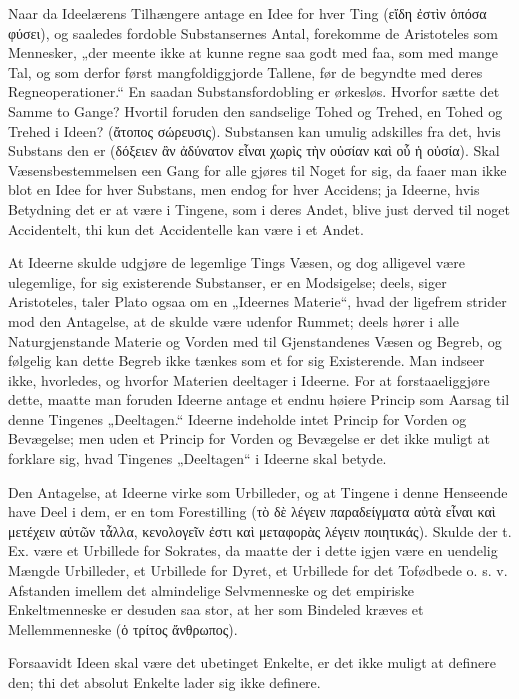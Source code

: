 \documentclass[12pt]{book}
\newcommand{\opage}[1]{\marginnote{\footnotesize\textit{[#1]}}}
\begin{document}
Naar da Ideelærens Tilhængere antage en Idee for hver Ting (εἴδη ἐστὶν ὁπόσα φύσει), og saaledes
fordoble Substansernes Antal, forekomme de Aristoteles som Mennesker, „der meente ikke at kunne
regne saa godt med faa, som med mange Tal, og som derfor først mangfoldiggjorde Tallene, før de
begyndte med deres Regneoperationer.“ En saadan Substansfordobling er ørkesløs. Hvorfor sætte det
Samme to Gange? Hvortil foruden den sandselige Tohed og Trehed, en Tohed og Trehed i Ideen?
(ἄτοπος σώρευσις). Substansen kan umulig adskilles fra det, hvis Substans den er (δόξειεν ἂν
ἀδύνατον εἶναι χωρὶς τὴν οὐσίαν καὶ οὗ ἡ οὐσία). Skal Væsensbestemmelsen een Gang for alle gjøres
til Noget for sig, da faaer man ikke blot en Idee for hver Substans, men endog for hver Accidens;
ja Ideerne, hvis Betydning det er at være i Tingene, som i deres Andet, blive just derved til
noget Accidentelt, thi kun det Accidentelle kan være i et Andet.

At Ideerne skulde udgjøre de legemlige Tings Væsen, og dog alligevel være ulegemlige, for sig
existerende Substanser, er en Modsigelse; deels, siger Aristoteles, taler Plato ogsaa om en
„Ideernes Materie“, hvad der ligefrem strider mod den Antagelse, at de skulde være udenfor
Rummet; deels hører i alle Naturgjenstande Materie og Vorden med til Gjenstandenes Væsen og
Begreb, og følgelig kan dette Begreb ikke tænkes som et for sig Existerende. Man indseer ikke,
hvorledes, og hvorfor Materien deeltager i Ideerne. For at forstaaeliggjøre dette, maatte man
foruden Ideerne antage et endnu høiere Princip som Aarsag til denne Tingenes „Deeltagen.“ Ideerne
indeholde intet Princip for Vorden og Bevægelse; men uden et Princip for Vorden og
\opage{139} Bevægelse er det ikke muligt at forklare sig, hvad Tingenes „Deeltagen“ i Ideerne skal betyde.

Den Antagelse, at Ideerne virke som Urbilleder, og at Tingene i denne Henseende have Deel i dem,
er en tom Forestilling (τὸ δὲ λέγειν παραδείγματα αὐτὰ εἶναι καὶ μετέχειν αὐτῶν τἆλλα, κενολογεῖν
ἐστι καὶ μεταφορὰς λέγειν ποιητικάς). Skulde der t. Ex. være et Urbillede for Sokrates, da maatte
der i dette igjen være en uendelig Mængde Urbilleder, et Urbillede for Dyret, et Urbillede for
det Tofødbede o. s. v. Afstanden imellem det almindelige Selvmenneske og det empiriske
Enkeltmenneske er desuden saa stor, at her som Bindeled kræves et Mellemmenneske (ὁ τρίτος
ἄνθρωπος).

Forsaavidt Ideen skal være det ubetinget Enkelte, er det ikke muligt at definere den; thi det
absolut Enkelte lader sig ikke definere.
\end{document}
